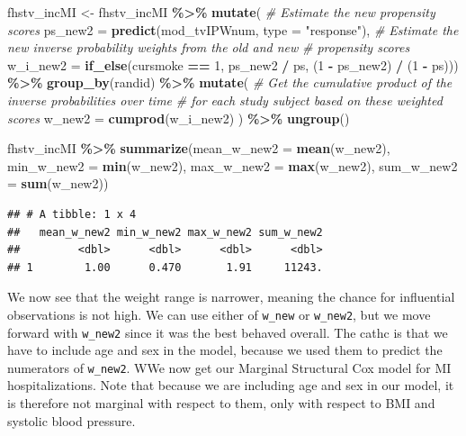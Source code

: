\documentclass[
]{book}
\newenvironment{Shaded}{\begin{snugshade}}{\end{snugshade}}
\newcommand{\AttributeTok}[1]{\textcolor[rgb]{0.13,0.29,0.53}{#1}}
\newcommand{\CommentTok}[1]{\textcolor[rgb]{0.56,0.35,0.01}{\textit{#1}}}
\newcommand{\DecValTok}[1]{\textcolor[rgb]{0.00,0.00,0.81}{#1}}
\newcommand{\FunctionTok}[1]{\textcolor[rgb]{0.13,0.29,0.53}{\textbf{#1}}}
\newcommand{\NormalTok}[1]{#1}
\newcommand{\OtherTok}[1]{\textcolor[rgb]{0.56,0.35,0.01}{#1}}
\newcommand{\SpecialCharTok}[1]{\textcolor[rgb]{0.81,0.36,0.00}{\textbf{#1}}}
\newcommand{\StringTok}[1]{\textcolor[rgb]{0.31,0.60,0.02}{#1}}
\begin{document}
\begin{Shaded}
\begin{Highlighting}[]
\NormalTok{fhstv\_incMI }\OtherTok{\textless{}{-}}\NormalTok{ fhstv\_incMI }\SpecialCharTok{\%\textgreater{}\%}
  \FunctionTok{mutate}\NormalTok{(}
    \CommentTok{\# Estimate the new propensity scores}
    \AttributeTok{ps\_new2 =} \FunctionTok{predict}\NormalTok{(mod\_tvIPWnum, }\AttributeTok{type =} \StringTok{"response"}\NormalTok{), }
    \CommentTok{\# Estimate the new inverse probability weights from the old and new }
    \CommentTok{\# propensity scores}
    \AttributeTok{w\_i\_new2 =} \FunctionTok{if\_else}\NormalTok{(cursmoke }\SpecialCharTok{==} \DecValTok{1}\NormalTok{, ps\_new2 }\SpecialCharTok{/}\NormalTok{ ps, (}\DecValTok{1} \SpecialCharTok{{-}}\NormalTok{ ps\_new2) }\SpecialCharTok{/}\NormalTok{ (}\DecValTok{1} \SpecialCharTok{{-}}\NormalTok{ ps))) }\SpecialCharTok{\%\textgreater{}\%} 
  \FunctionTok{group\_by}\NormalTok{(randid) }\SpecialCharTok{\%\textgreater{}\%}
  \FunctionTok{mutate}\NormalTok{(}
    \CommentTok{\# Get the cumulative product of the inverse probabilities over time}
    \CommentTok{\# for each study subject based on these weighted scores}
    \AttributeTok{w\_new2 =} \FunctionTok{cumprod}\NormalTok{(w\_i\_new2)}
\NormalTok{  ) }\SpecialCharTok{\%\textgreater{}\%} 
  \FunctionTok{ungroup}\NormalTok{()}

\NormalTok{fhstv\_incMI }\SpecialCharTok{\%\textgreater{}\%}
  \FunctionTok{summarize}\NormalTok{(}\AttributeTok{mean\_w\_new2 =} \FunctionTok{mean}\NormalTok{(w\_new2),}
            \AttributeTok{min\_w\_new2 =} \FunctionTok{min}\NormalTok{(w\_new2),}
            \AttributeTok{max\_w\_new2 =} \FunctionTok{max}\NormalTok{(w\_new2),}
            \AttributeTok{sum\_w\_new2 =} \FunctionTok{sum}\NormalTok{(w\_new2))}
\end{Highlighting}
\end{Shaded}

\begin{verbatim}
## # A tibble: 1 x 4
##   mean_w_new2 min_w_new2 max_w_new2 sum_w_new2
##         <dbl>      <dbl>      <dbl>      <dbl>
## 1        1.00      0.470       1.91     11243.
\end{verbatim}

We now see that the weight range is narrower, meaning the chance for influential observations is not high. We can use either of \texttt{w\_new} or \texttt{w\_new2}, but we move forward with \texttt{w\_new2} since it was the best behaved overall. The cathc is that we have to include age and sex in the model, because we used them to predict the numerators of \texttt{w\_new2}. WWe now get our Marginal Structural Cox model for MI hospitalizations. Note that because we are including age and sex in our model, it is therefore not marginal with respect to them, only with respect to BMI and systolic blood pressure.
\end{document}
